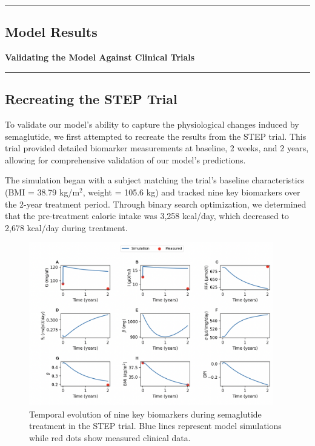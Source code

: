 {\color{gray}\hrule}
\begin{center}
\section{Model Results}
\textbf{Validating the Model Against Clinical Trials}
\bigskip
\end{center}
{\color{gray}\hrule}

\subsection{Recreating the STEP Trial}
To validate our model's ability to capture the physiological changes induced by semaglutide, we first attempted to recreate the results from the STEP trial. This trial provided detailed biomarker measurements at baseline, 2 weeks, and 2 years, allowing for comprehensive validation of our model's predictions.

The simulation began with a subject matching the trial's baseline characteristics (BMI = 38.79 kg/m$^2$, weight = 105.6 kg) and tracked nine key biomarkers over the 2-year treatment period. Through binary search optimization, we determined that the pre-treatment caloric intake was 3,258 kcal/day, which decreased to 2,678 kcal/day during treatment.

\begin{figure}[h]
\centering
\includegraphics[width=0.95\textwidth]{images/step_trial_simulations.png}
\caption{Temporal evolution of nine key biomarkers during semaglutide treatment in the STEP trial. Blue lines represent model simulations while red dots show measured clinical data.}
\label{fig:step_trial}
\end{figure}


